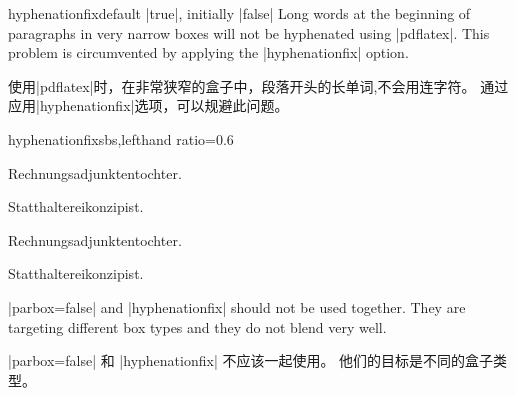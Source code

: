 \begin{docTcbKey}{hyphenationfix}{}{default |true|, initially |false|}
Long words at the beginning of paragraphs in very narrow boxes
will not be hyphenated using |pdflatex|. This problem is circumvented by
applying the |hyphenationfix| option.

使用|pdflatex|时，在非常狭窄的盒子中，段落开头的长单词,不会用连字符。%
通过应用|hyphenationfix|选项，可以规避此问题。
\begin{exdispExample*}{hyphenationfix}{sbs,lefthand ratio=0.6}

\begin{tcolorbox}
Rechnungsadjunktentochter.\par
Statthaltereikonzipist.
\end{tcolorbox}

\begin{tcolorbox}[hyphenationfix]
Rechnungsadjunktentochter.\par
Statthaltereikonzipist.
\end{tcolorbox}
\end{exdispExample*}

\smallskip
\begin{marker}
|parbox=false| and |hyphenationfix| should not be used together. 
They are targeting different box types and they do not blend very well.

|parbox=false| 和 |hyphenationfix| 不应该一起使用。%
他们的目标是不同的盒子类型。%
\end{marker}
\end{docTcbKey}